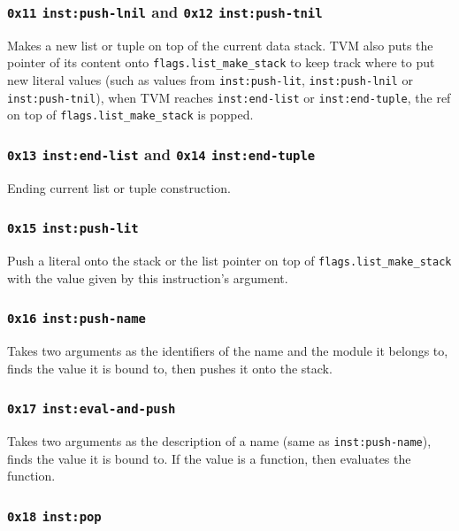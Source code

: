 \documentclass{article}
\newcommand{\inst}[1] {\texttt{inst:#1}}
\begin{document}
\subsubsection{\texttt{0x11} \inst{push-lnil} and \texttt{0x12} \inst{push-tnil}}

Makes a new list or tuple on top of the current data stack. TVM also puts the pointer of its content onto \texttt{flags.list\_make\_stack} to keep track where to put new literal values (such as values from \inst{push-lit}, \inst{push-lnil} or \inst{push-tnil}), when TVM reaches \inst{end-list} or \inst{end-tuple}, the ref on top of \texttt{flags.list\_make\_stack} is popped.

\subsubsection{\texttt{0x13} \inst{end-list} and \texttt{0x14} \inst{end-tuple}}

Ending current list or tuple construction.

\subsubsection{\texttt{0x15} \inst{push-lit}}

Push a literal onto the stack or the list pointer on top of \texttt{flags.list\_make\_stack} with the value given by this instruction's argument.

\subsubsection{\texttt{0x16} \inst{push-name}}

Takes two arguments as the identifiers of the name and the module it belongs to, finds the value it is bound to, then pushes it onto the stack.

\subsubsection{\texttt{0x17} \inst{eval-and-push}}

Takes two arguments as the description of a name (same as \inst{push-name}), finds the value it is bound to. If the value is a function, then evaluates the function.

\subsubsection{\texttt{0x18} \inst{pop}}
\end{document}
